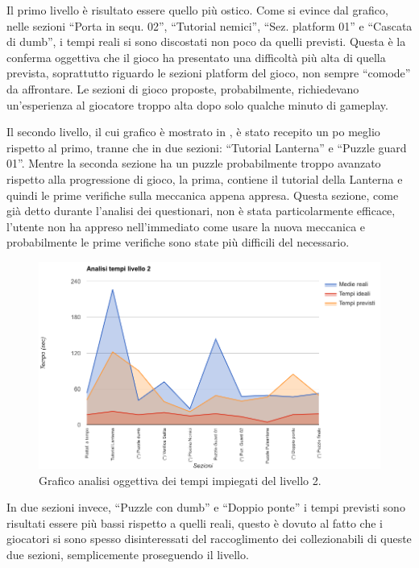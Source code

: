 Il primo livello è risultato essere quello più ostico. Come si evince dal grafico, nelle sezioni ``Porta in sequ. 02'', ``Tutorial nemici'', ``Sez. platform 01'' e ``Cascata di dumb'', i tempi reali si sono discostati non poco da quelli previsti. Questa è la conferma oggettiva che il gioco ha presentato una difficoltà più alta di quella prevista, soprattutto riguardo le sezioni platform del gioco, non sempre ``comode'' da affrontare. Le sezioni di gioco proposte, probabilmente, richiedevano un'esperienza al giocatore troppo alta dopo solo qualche minuto di gameplay.

Il secondo livello, il cui grafico è mostrato in \myfig{\ref{fig:test_analisi_tempi_02}}, è stato recepito un po meglio rispetto al primo, tranne che in due sezioni: ``Tutorial Lanterna'' e ``Puzzle guard 01''. Mentre la seconda sezione ha un puzzle probabilmente troppo avanzato rispetto alla progressione di gioco, la prima, contiene il tutorial della Lanterna e quindi le prime verifiche sulla meccanica appena appresa. Questa sezione, come già detto durante l'analisi dei questionari, non è stata particolarmente efficace, l'utente non ha appreso nell'immediato come usare la nuova meccanica e probabilmente le prime verifiche sono state più difficili del necessario.

\begin{figure}[h]
\centerline{\includegraphics[scale=0.45]{images/risultati/test_01_analisi_tempi_02.png}}
\caption{Grafico analisi oggettiva dei tempi impiegati del livello 2.}
\label{fig:test_analisi_tempi_02}
\end{figure}

In due sezioni invece, ``Puzzle con dumb'' e ``Doppio ponte'' i tempi previsti sono risultati essere più bassi rispetto a quelli reali, questo è dovuto al fatto che i giocatori si sono spesso disinteressati del raccoglimento dei collezionabili di queste due sezioni, semplicemente proseguendo il livello.

